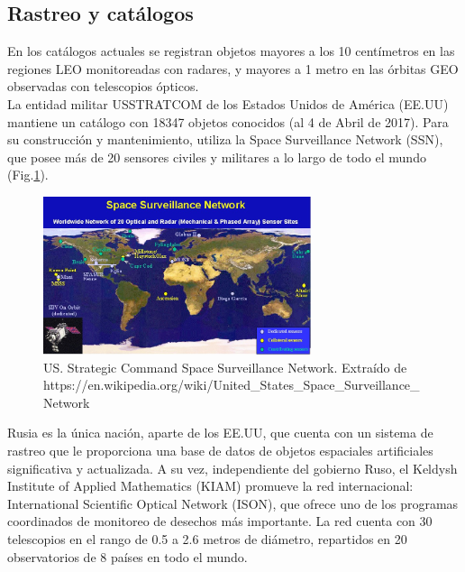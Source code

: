 
\subsection{Rastreo y cat\'alogos}\label{subsec:redes}

En los catálogos actuales se registran objetos mayores a los 10 cent\'imetros en las regiones LEO monitoreadas con radares, y mayores a 1 metro en las \'orbitas \ac{GEO} observadas con telescopios \'opticos.\\
 
La entidad militar \ac{USSTRATCOM} de los Estados Unidos de Am\'erica (EE.UU) mantiene un catálogo con 18347 objetos conocidos (al 4 de Abril de 2017). Para su construcci\'on y mantenimiento, utiliza la Space Surveillance Network (SSN), que posee m\'as de 20 sensores civiles y militares a lo largo de todo el mundo (Fig.\ref{fig:usnet}).\\

\begin{figure}[!h]
  \centering
  \includegraphics[width=0.7\textwidth]{imagenes/SpSNet}
  \caption[USSTRATCOM - SSN]{US. Strategic Command Space Surveillance Network. Extra\'ido de https://en.wikipedia.org/wiki/United\_States\_Space\_Surveillance\_Network}
  \label{fig:usnet}
\end{figure}

Rusia es la \'unica naci\'on, aparte de los EE.UU, que cuenta con un sistema de rastreo que le proporciona una base de datos de objetos espaciales artificiales significativa y actualizada. A su vez, independiente del gobierno Ruso, el Keldysh Institute of Applied Mathematics (KIAM) promueve la red internacional: International Scientific Optical Network (ISON), que ofrece uno de los programas coordinados de monitoreo de desechos m\'as importante.
La red cuenta con 30 telescopios en el rango de 0.5 a 2.6 metros de di\'ametro, repartidos en 20 observatorios de 8 pa\'ises en todo el mundo.\\

